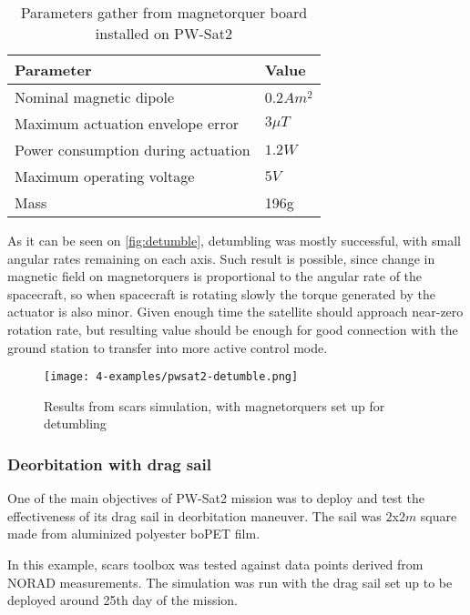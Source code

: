             \begin{table}[H]
                \centering    
                \small
                \begin{tabular}{l l}
                    \textbf{Parameter} & \textbf{Value} \\[0.1cm]\hline
                    \rule{0pt}{1.2\normalbaselineskip}Nominal magnetic dipole & $0.2 Am^2$ \\
                    Maximum actuation envelope error & $3\mu T$ \\
                    Power consumption during actuation & $1.2W$ \\
                    Maximum operating voltage & $5V$ \\
                    Mass & 196g
                \end{tabular}
                \caption{Parameters gather from magnetorquer board installed on PW-Sat2}\label{table:pwsat2magne}
            \end{table}

            As it can be seen on \autoref{fig:detumble}, detumbling was mostly successful, with small angular rates remaining on each axis. Such result is possible, since change in magnetic field on magnetorquers is proportional to the angular rate of the spacecraft, so when spacecraft is rotating slowly the torque generated by the actuator is also minor. Given enough time the satellite should approach near-zero rotation rate, but resulting value should be enough for good connection with the ground station to transfer into more active control mode. 

            \begin{figure}[H]
                \centering
                \texttt{[image: 4-examples/pwsat2-detumble.png]}
                \caption{Results from \ac{scars} simulation, with magnetorquers set up for detumbling}
                \label{fig:detumble}
            \end{figure}

        \subsubsection{Deorbitation with drag sail}
            One of the main objectives of PW-Sat2 mission was to deploy and test the effectiveness of its drag sail in deorbitation maneuver. The sail was  $2$x$2m$ square made from aluminized polyester boPET film\cite{pwsat2dt}.
            
            In this example, \ac{scars} toolbox was tested against data points derived from NORAD measurements. The simulation was run with the drag sail set up to be deployed around 25th day of the mission.
                         

